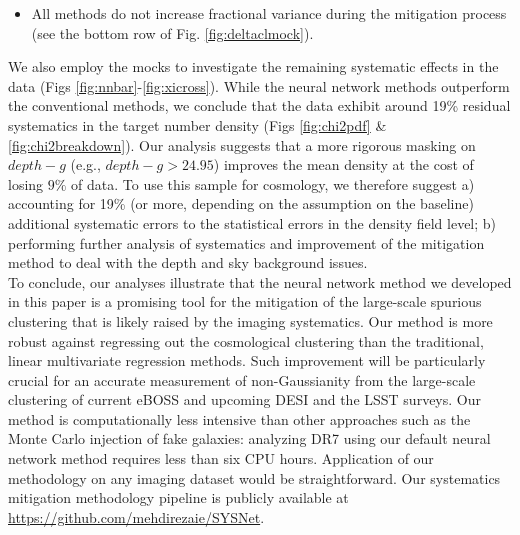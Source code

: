 \begin{itemize}
    \item All methods do not increase fractional variance during the mitigation process (see the bottom row of Fig. \ref{fig:deltaclmock}).\\
        
\end{itemize}

We also employ the mocks to investigate the remaining systematic effects in the data (Figs \ref{fig:nnbar}-\ref{fig:xicross}). While the neural network methods outperform the conventional methods, we conclude that the data exhibit around 19\% residual systematics in the target number density (Figs \ref{fig:chi2pdf} \& \ref{fig:chi2breakdown}). Our analysis suggests that a more rigorous masking on  $depth-g$ (e.g., $depth-g>24.95$) improves the mean density at the cost of losing $9\%$ of data. To use this sample for cosmology, we therefore suggest a) accounting for 19\%  (or more, depending on the assumption on the baseline) additional systematic errors to the statistical errors in the density field level; b) performing further analysis of systematics and improvement of the mitigation method to deal with the depth and sky background issues.\\


To conclude, our analyses illustrate that the neural network method we developed in this paper is a promising tool for the mitigation of the large-scale spurious clustering that is likely raised by the imaging systematics. Our method is more robust against regressing out the cosmological clustering than the traditional, linear multivariate regression methods. Such improvement will be particularly crucial for an accurate measurement of non-Gaussianity from the large-scale clustering of current eBOSS and upcoming DESI and the LSST surveys. Our method is computationally less intensive than other approaches such as the Monte Carlo injection of fake galaxies: analyzing DR7 using our default neural network method requires less than six CPU hours. Application of our methodology on any imaging dataset would be straightforward. Our systematics mitigation methodology pipeline is publicly available at \url{https://github.com/mehdirezaie/SYSNet}.